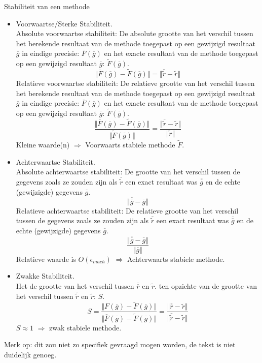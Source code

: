 \documentclass[samenvatting.tex]{subfiles}
\begin{document}
\begin{defi}
Stabiliteit van een methode\\
\begin{itemize}
\item Voorwaartse/Sterke Stabiliteit.\\
Absolute voorwaartse stabiliteit:
De absolute grootte van het verschil tussen het berekende resultaat van de methode toegepast op een gewijzigd resultaat $\overline{g}$ in eindige precisie: $\overline{F}(\overline{g})$ en het exacte resultaat van de methode toegepast op een gewijzigd resultaat $\overline{g}$: $\widetilde{F}(\overline{g})$.
\[
\Vert \overline{F}(\overline{g}) - \widetilde{F}(\overline{g}) \Vert
=
\Vert \overline{\widetilde{r}}-\widetilde{r} \Vert
\]
Relatieve voorwaartse stabiliteit:
De relatieve grootte van het verschil tussen het berekende resultaat van de methode toegepast op een gewijzigd resultaat $\overline{g}$ in eindige precisie: $\overline{F}(\overline{g})$ en het exacte resultaat van de methode toegepast op een gewijzigd resultaat $\overline{g}$: $\widetilde{F}(\overline{g})$.
\[
\frac{\Vert \overline{F}(\overline{g}) - \widetilde{F}(\overline{g}) \Vert}{\Vert \widetilde{F}(\overline{g}) \Vert}
=
\frac{\Vert \overline{\widetilde{r}}-\widetilde{r} \Vert}{\Vert \widetilde{r} \Vert}
\]
Kleine waarde(n) $\Rightarrow$ Voorwaarts stabiele methode $\widetilde{F}$.

\item Achterwaartse Stabiliteit.\\
Absolute achterwaartse stabiliteit: De grootte van het verschil tussen de gegevens zoals ze zouden zijn als $\overline{\widetilde{r}}$ een exact resultaat was $\overline{\overline{g}}$ en de echte (gewijzigde) gegevens $\overline{g}$. 
\[
\Vert \overline{\overline{g}} - \overline{g} \Vert
\]
Relatieve achterwaartse stabiliteit: De relatieve grootte van het verschil tussen de gegevens zoals ze zouden zijn als $\overline{\widetilde{r}}$ een exact resultaat was $\overline{\overline{g}}$ en de echte (gewijzigde) gegevens $\overline{g}$. 
\[
\frac{\Vert \overline{\overline{g}} - \overline{g} \Vert}{\Vert \overline{g} \Vert}
\]
Relatieve waarde is $O(\epsilon_{mach})$ $\Rightarrow$ Achterwaarts stabiele methode.

\item Zwakke Stabiliteit.\\
Het de grootte van het verschil tussen $\overline{\overline{r}}$ en $\widetilde{r}$. ten opzichte van de grootte van het verschil tussen $\overline{\widetilde{r}}$ en $\widetilde{r}$: $S$.
\[
S =
\frac
{\Vert F(\overline{g}) - \widetilde{F}(\overline{g}) \Vert}
{\Vert \overline{F}(\overline{g}) - \widetilde{F}(\overline{g})\Vert}
=
\frac
{\Vert \overline{\overline{r}} - \widetilde{r} \Vert}
{\Vert \overline{\widetilde{r}} - \widetilde{r}\Vert}
\]
$S \approx 1$ $\Rightarrow$ zwak stabiele methode.
\end{itemize}
Merk op: dit zou niet zo specifiek gevraagd mogen worden, de tekst is niet duidelijk genoeg.
\end{defi}
\end{document}
